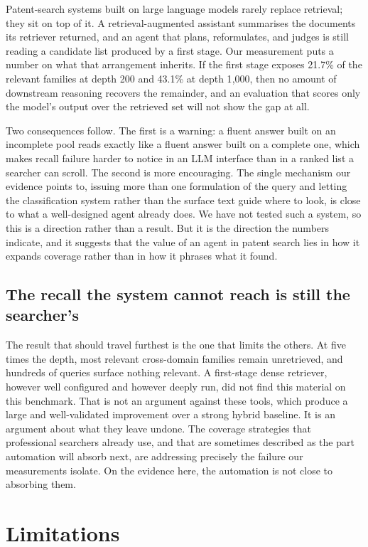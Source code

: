 \documentclass[preprint,11pt,authoryear]{elsarticle}          %
\begin{document}
Patent-search systems built on large language models rarely replace retrieval; they sit
on top of it. A retrieval-augmented assistant summarises the documents its retriever
returned, and an agent that plans, reformulates, and judges is still reading a candidate
list produced by a first stage. Our measurement puts a number on what that arrangement
inherits. If the first stage exposes 21.7\% of the relevant families at depth 200 and
43.1\% at depth 1{,}000, then no amount of downstream reasoning recovers the remainder,
and an evaluation that scores only the model's output over the retrieved set will not
show the gap at all.

Two consequences follow. The first is a warning: a fluent answer built on an incomplete
pool reads exactly like a fluent answer built on a complete one, which makes recall
failure harder to notice in an LLM interface than in a ranked list a searcher can scroll.
The second is more encouraging. The single mechanism our evidence points to, issuing more
than one formulation of the query and letting the classification system rather than the
surface text guide where to look, is close to what a well-designed agent already does. We
have not tested such a system, so this is a direction rather than a result. But it is the
direction the numbers indicate, and it suggests that the value of an agent in patent
search lies in how it expands coverage rather than in how it phrases what it found.

\subsection{The recall the system cannot reach is still the searcher's}

The result that should travel furthest is the one that limits the others. At five times the depth, most relevant cross-domain families remain unretrieved, and hundreds of queries surface nothing relevant. A first-stage dense retriever, however well configured and however deeply run, did not find this material on this benchmark. That is not an argument against these tools, which produce a large and well-validated improvement over a strong hybrid baseline. It is an argument about what they leave undone. The coverage strategies that professional searchers already use, and that are sometimes described as the part automation will absorb next, are addressing precisely the failure our measurements isolate. On the evidence here, the automation is not close to absorbing them.

\section{Limitations}
\label{sec:limitations}
\end{document}
